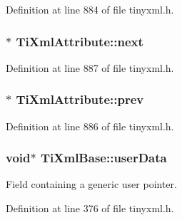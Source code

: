 Definition at line 884 of file tinyxml.h.

\hypertarget{classTiXmlAttribute_ae851adf61b80cf45b797fee77dea135f}{
\subsubsection[{next}]{$\ast$ {\bf TiXmlAttribute::next}}}
\label{d4/dc1/classTiXmlAttribute_ae851adf61b80cf45b797fee77dea135f}


Definition at line 887 of file tinyxml.h.

\hypertarget{classTiXmlAttribute_aaf6c6272c625fbf38e571cbf570ea94a}{
\subsubsection[{prev}]{$\ast$ {\bf TiXmlAttribute::prev}}}
\label{d4/dc1/classTiXmlAttribute_aaf6c6272c625fbf38e571cbf570ea94a}


Definition at line 886 of file tinyxml.h.

\hypertarget{classTiXmlBase_ab242c01590191f644569fa89a080d97c}{
\subsubsection[{userData}]{\setlength{\rightskip}{0pt plus 5cm}void$\ast$ {\bf TiXmlBase::userData}}}
\label{d8/d47/classTiXmlBase_ab242c01590191f644569fa89a080d97c}


Field containing a generic user pointer. 



Definition at line 376 of file tinyxml.h.

